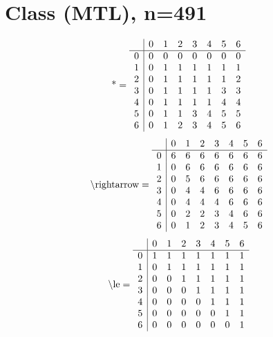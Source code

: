 \documentclass[11pt]{article}
\begin{document}
\section{Class (MTL), n=491}
\[\text{*} = 
\begin{array}{r | r r r r r r r}
 & 0 & 1 & 2 & 3 & 4 & 5 & 6 \\ \hline
0 & 0 & 0 & 0 & 0 & 0 & 0 & 0 \\
1 & 0 & 1 & 1 & 1 & 1 & 1 & 1 \\
2 & 0 & 1 & 1 & 1 & 1 & 1 & 2 \\
3 & 0 & 1 & 1 & 1 & 1 & 3 & 3 \\
4 & 0 & 1 & 1 & 1 & 1 & 4 & 4 \\
5 & 0 & 1 & 1 & 3 & 4 & 5 & 5 \\
6 & 0 & 1 & 2 & 3 & 4 & 5 & 6 \\
\end{array}
\]
\[\text{\textbackslash rightarrow} = 
\begin{array}{r | r r r r r r r}
 & 0 & 1 & 2 & 3 & 4 & 5 & 6 \\ \hline
0 & 6 & 6 & 6 & 6 & 6 & 6 & 6 \\
1 & 0 & 6 & 6 & 6 & 6 & 6 & 6 \\
2 & 0 & 5 & 6 & 6 & 6 & 6 & 6 \\
3 & 0 & 4 & 4 & 6 & 6 & 6 & 6 \\
4 & 0 & 4 & 4 & 4 & 6 & 6 & 6 \\
5 & 0 & 2 & 2 & 3 & 4 & 6 & 6 \\
6 & 0 & 1 & 2 & 3 & 4 & 5 & 6 \\
\end{array}
\]
\[\text{\textbackslash le} = 
\begin{array}{r | r r r r r r r}
 & 0 & 1 & 2 & 3 & 4 & 5 & 6 \\ \hline
0 & 1 & 1 & 1 & 1 & 1 & 1 & 1 \\
1 & 0 & 1 & 1 & 1 & 1 & 1 & 1 \\
2 & 0 & 0 & 1 & 1 & 1 & 1 & 1 \\
3 & 0 & 0 & 0 & 1 & 1 & 1 & 1 \\
4 & 0 & 0 & 0 & 0 & 1 & 1 & 1 \\
5 & 0 & 0 & 0 & 0 & 0 & 1 & 1 \\
6 & 0 & 0 & 0 & 0 & 0 & 0 & 1 \\
\end{array}
\]
\end{document}
